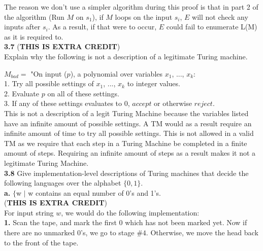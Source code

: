 \documentclass[12pt]{article}
\newcommand\tab[1][1cm]{\hspace*{#1}}
\begin{document}
The reason we don't use a simpler algorithm during this proof is that in part 2 
of the algorithm (Run $M$ on $s_1$), if $M$ loops on the input $s_i$, $E$ will not 
check any inputs after $s_i$. As a result, if that were to occur, $E$ could fail to
enumerate L(M) as it is required to. \\

\textbf{3.7} (\textbf{THIS IS EXTRA CREDIT}) \\

Explain why the following is not a description of a legitimate Turing machine.

$M_{bad} =$ "On input ($p$), a polynomial over variables $x_1$, ..., $x_k$: \\
\tab 1. Try all possible settings of $x_1$, ..., $x_k$ to integer values. \\
\tab 2. Evaluate $p$ on all of these settings. \\
\tab 3. If any of these settings evaluates to 0, $accept$ or otherwise $reject$. \\

This is not a description of a legit Turing Machine because the variables listed
have an infinite amount of possible settings. A TM would as a result require an
infinite amount of time to try all possible settings. This is not allowed in a
valid TM as we require that each step in a Turing Machine be completed in a finite
amount of steps. Requiring an infinite amount of steps as a result makes it not
a legitimate Turing Machine. \\

\pagebreak
\textbf{3.8} Give implementation-level descriptions of Turing machines that decide the following
languages over the alphabet $\{0,1\}$. \\

\textbf{a.} $\{$w $\mid$ w contains an equal number of 0's and 1's. \\
(\textbf{THIS IS EXTRA CREDIT})  \\

For input string $w$, we would do the following implementation: \\
\textbf{1.} Scan the tape, and mark the first 0 which has not been marked
yet. Now if there are no unmarked 0's, we go to stage $\# 4$. Otherwise,
we move the head back to the front of the tape. \\
\end{document}
